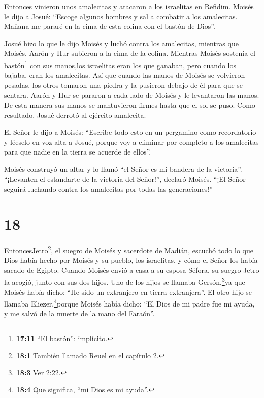  Entonces vinieron unos amalecitas y atacaron a los
israelitas en Refidim.  Moisés le dijo a Josué: ``Escoge
algunos hombres y sal a combatir a los amalecitas. Mañana me pararé en
la cima de esta colina con el bastón de Dios''.

 Josué hizo lo que le dijo Moisés y luchó contra los
amalecitas, mientras que Moisés, Aarón y Hur subieron a la cima de la
colina.  Mientras Moisés sostenía el bastón\footnote{\textbf{17:11}
  ``El bastón'': implícito.} con sus manos,los israelitas eran los que
ganaban, pero cuando los bajaba, eran los amalecitas.  Así
que cuando las manos de Moisés se volvieron pesadas, los otros tomaron
una piedra y la pusieron debajo de él para que se sentara. Aarón y Hur
se pararon a cada lado de Moisés y le levantaron las manos. De esta
manera sus manos se mantuvieron firmes hasta que el sol se puso.
 Como resultado, Josué derrotó al ejército amalecita.

 El Señor le dijo a Moisés: ``Escribe todo esto en un
pergamino como recordatorio y léeselo en voz alta a Josué, porque voy a
eliminar por completo a los amalecitas para que nadie en la tierra se
acuerde de ellos''.

 Moisés construyó un altar y lo llamó ``el Señor es mi
bandera de la victoria''.  ``¡Levanten el estandarte de la
victoria del Señor!'', declaró Moisés. ``¡El Señor seguirá luchando
contra los amalecitas por todas las generaciones!''

\hypertarget{section-17}{%
\section{18}\label{section-17}}

 EntoncesJetro\footnote{\textbf{18:1} También llamado Reuel
  en el capítulo 2.}, el suegro de Moisés y sacerdote de Madián, escuchó
todo lo que Dios había hecho por Moisés y su pueblo, los israelitas, y
cómo el Señor los había sacado de Egipto.  Cuando Moisés
envió a casa a su esposa Séfora, su suegro Jetro la acogió, 
junto con sus dos hijos. Uno de los hijos se llamaba
Gersón,\footnote{\textbf{18:3} Ver 2:22.}ya que Moisés había dicho: ``He
sido un extranjero en tierra extranjera''.  El otro hijo se
llamaba Eliezer,\footnote{\textbf{18:4} Que significa, ``mi Dios es mi
  ayuda''.}porque Moisés había dicho: ``El Dios de mi padre fue mi
ayuda, y me salvó de la muerte de la mano del Faraón''.

